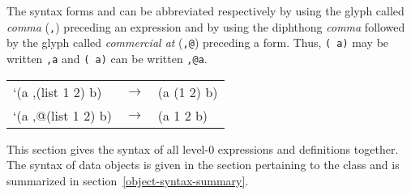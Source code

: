 \begin{optDefinition}
The syntax forms  and  can be
abbreviated respectively by using the glyph called {\em comma}
(\verb+,+) preceding an expression
and by using the diphthong {\em comma} followed by the glyph called {\em
    commercial at} (\verb+,@+)
preceding a form.  Thus, {\tt ( a)} may be written {\tt ,a}
and {\tt ( a)} can be written {\tt ,@a}.
%
\examples
{\small\tt\begin{tabular}{lll}
        `(a ,(list 1 2) b) & $\rightarrow$ & (a (1 2) b)\\
        `(a ,@(list 1 2) b) & $\rightarrow$ & (a 1 2 b)
\end{tabular}}
%
\end{optDefinition}

%
\begin{optDefinition}
\noindent
This section gives the syntax of all level-0 expressions and definitions
together.  The syntax of data objects is given in the section pertaining to the
class and is summarized in section~\ref{object-syntax-summary}.  \raggedbottom
%
%

%
\usebox{\genericLambdaSyntax}
\usebox{\lambdaSyntax}
\usebox{\functioncallSyntax}
\usebox{\quoteSyntax}
\usebox{\setqSyntax}
\usebox{\ifSyntax}
\usebox{\prognSyntax}
\usebox{\unwindprotectSyntax}
\usebox{\applySyntax}

%
\usebox{\condSyntax}
\usebox{\andSyntax}
\usebox{\orSyntax}
\usebox{\blockSyntax}
\usebox{\returnfromSyntax}
\usebox{\quasiquoteSyntax}
\usebox{\unquoteSyntax}
\usebox{\unquotespliceSyntax}

\flushbottom
\end{optDefinition}
